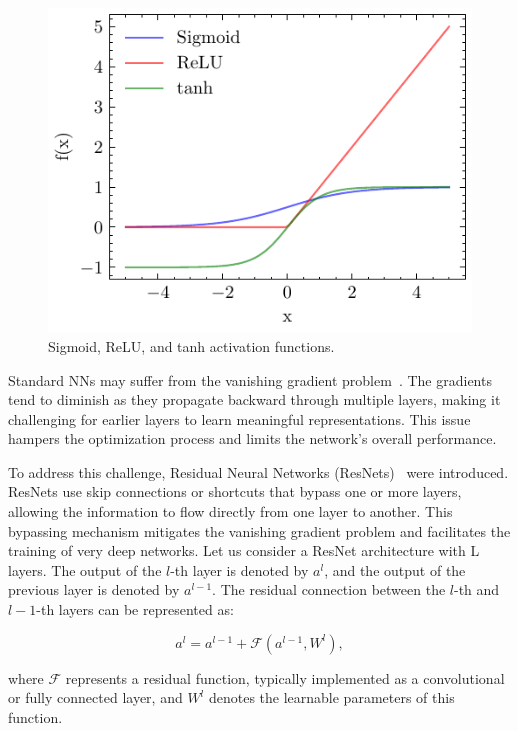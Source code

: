 \documentclass[ppgc,diss,english]{iiufrgs}
\begin{document}
\begin{figure}[ht]
\caption{Sigmoid, ReLU, and tanh activation functions.}
\centerline{\includegraphics[]{img/sigmoid-relu-tanh}}
\label{fig:activation-functions}
\end{figure}

Standard NNs may suffer from the vanishing gradient problem~\cite{Bengio.etal/1994}. The gradients tend to diminish as they propagate backward through multiple layers, making it challenging for earlier layers to learn meaningful representations. This issue hampers the optimization process and limits the network's overall performance.

To address this challenge, Residual Neural Networks (ResNets)~\cite{He.etal/2016} were introduced. ResNets use skip connections or shortcuts that bypass one or more layers, allowing the information to flow directly from one layer to another. This bypassing mechanism mitigates the vanishing gradient problem and facilitates the training of very deep networks. Let us consider a ResNet architecture with L layers. The output of the $l$-th layer is denoted by $a^{l}$, and the output of the previous layer is denoted by $a^{l-1}$. The residual connection between the $l$-th and $l-1$-th layers can be represented as:

$$a^{l} = a^{l-1} + \mathcal{F}(a^{l-1}, W^{l}),$$

where $\mathcal{F}$ represents a residual function, typically implemented as a convolutional or fully connected layer, and $W^{l}$ denotes the learnable parameters of this function.
\end{document}
